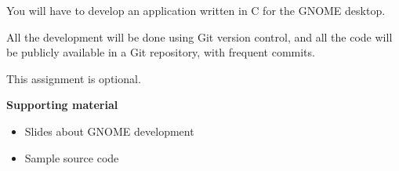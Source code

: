 \documentclass[a4paper]{article}
\begin{document}
You will have to develop an application written in C for the GNOME
desktop.

All the development will be done using Git version control, and all
the code will be publicly available in a Git repository, with frequent
commits.

This assignment is optional.


\textbf{Supporting material}

\begin{itemize}
\item Slides about GNOME development
\item Sample source code
\end{itemize}


\end{document}
